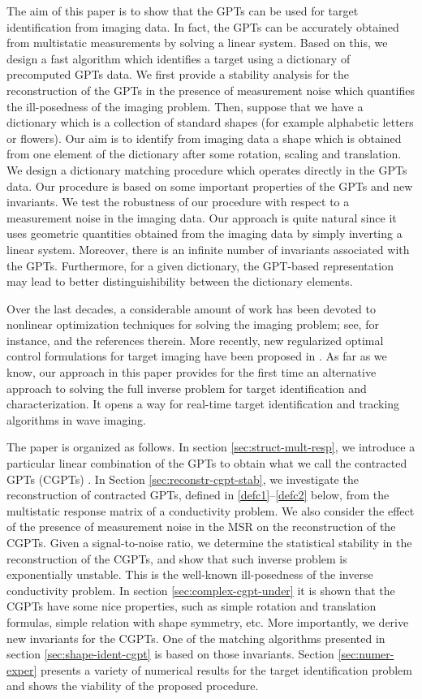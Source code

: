 The aim of this paper is to show that the GPTs can be used for
target identification from imaging data. In fact, the GPTs can be
accurately obtained from multistatic measurements by solving a
linear system. Based on this, we design a fast algorithm which
identifies a target using a dictionary of precomputed GPTs data.
We first provide a stability analysis for the reconstruction of
the GPTs in the presence of measurement noise which quantifies the
ill-posedness of the imaging problem. Then, suppose that we have a
dictionary which is a collection of standard shapes (for example
alphabetic letters or flowers). Our aim is to identify from
imaging data a shape which is obtained from one element of the
dictionary after some rotation, scaling and translation. We design
a dictionary matching procedure which operates directly in the
GPTs data. Our procedure is based on some important properties of
the GPTs and new invariants. We test the robustness of our
procedure with respect to a measurement noise in the imaging data.
Our approach is quite natural since it uses geometric quantities
obtained from the imaging data by simply inverting a linear
system. Moreover, there is an infinite number of invariants
associated with the GPTs. Furthermore, for a given dictionary, the
GPT-based representation may lead to better distinguishibility
between the dictionary elements.


Over the last decades, a considerable amount of work has been
devoted to nonlinear optimization techniques for solving the
imaging problem; see, for instance, \cite{opt,opt1,opt2} and the
references therein. More recently, new regularized optimal control
formulations for target imaging have been proposed in
\cite{optnew1,optnew2}. As far as we know, our approach in this
paper provides for the first time an alternative approach to
solving the full inverse problem for target identification and
characterization. It opens a way for real-time target
identification and tracking algorithms in wave imaging.


The paper is organized as follows. In section
\ref{sec:struct-mult-resp}, we introduce a particular linear
combination of the GPTs  to obtain what we call the contracted
GPTs (CGPTs) \cite{AKLL11}. In Section
\ref{sec:reconstr-cgpt-stab}, we investigate the reconstruction of
contracted GPTs, defined in \eqref{defc1}--\eqref{defc2} below,
from the multistatic response matrix of a conductivity problem. We
also consider the effect of the presence of measurement noise in
the MSR on the reconstruction of the CGPTs. Given a
signal-to-noise ratio, we determine  the statistical stability in
the reconstruction of the CGPTs, and show that such inverse
problem is exponentially unstable. This is the well-known
ill-posedness of the inverse conductivity problem. In section
\ref{sec:complex-cgpt-under} it is shown that the CGPTs have some
nice properties, such as simple rotation and translation formulas,
simple relation with shape symmetry, etc. More importantly, we
derive new invariants for the CGPTs. One of the matching
algorithms presented in section \ref{sec:shape-ident-cgpt} is
based on those invariants. Section \ref{sec:numer-exper} presents
a variety of numerical results for the target identification
problem and shows the viability of the proposed procedure.

